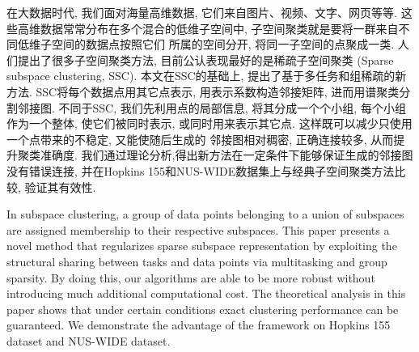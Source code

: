 \begin{cnabstract}
  在大数据时代, 我们面对海量高维数据, 它们来自图片、视频、文字、网页等等.
  这些高维数据常常分布在多个混合的低维子空间中,
  子空间聚类就是要将一群来自不同低维子空间的数据点按照它们
  所属的空间分开, 将同一子空间的点聚成一类.
  人们提出了很多子空间聚类方法, 目前公认表现最好的是稀疏子空间聚类
  (Sparse subspace clustering, SSC). 本文在SSC的基础上,
  提出了基于多任务和组稀疏的新方法.
  SSC将每个数据点用其它点表示, 用表示系数构造邻接矩阵,
  进而用谱聚类分割邻接图.
  不同于SSC, 我们先利用点的局部信息, 将其分成一个个小组,
  每个小组作为一个整体, 使它们被同时表示, 或同时用来表示其它点.
  这样既可以减少只使用一个点带来的不稳定, 又能使随后生成的
  邻接图相对稠密, 正确连接较多, 从而提升聚类准确度.
  我们通过理论分析,得出新方法在一定条件下能够保证生成的邻接图
  没有错误连接, 并在Hopkins 155和NUS-WIDE数据集上与经典子空间聚类方法比较,
  验证其有效性.
  
\end{cnabstract}

\begin{enabstract}
  In subspace clustering, a group of data points belonging
  to a union of subspaces are assigned membership to their
  respective subspaces. This paper presents a novel method
  that regularizes sparse subspace representation by exploiting the
  structural sharing between tasks and data points via multitasking
  and group sparsity. By doing this, our algorithms are able to be more robust
  without introducing much additional computational cost. The
  theoretical analysis in this paper shows that under certain conditions
  exact clustering performance can be guaranteed. We demonstrate
  the advantage of the framework on Hopkins 155 dataset and NUS-WIDE dataset.

\end{enabstract}
